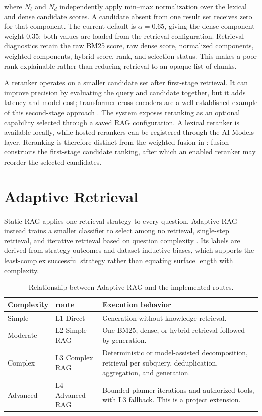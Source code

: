 \noindent where $N_{\ell}$ and $N_d$ independently apply min--max
normalization over the lexical and dense candidate scores. A candidate absent
from one result set receives zero for that component. The current default is
$\alpha=0.65$, giving the dense component weight $0.35$; both values are loaded
from the retrieval configuration. Retrieval diagnostics retain the raw BM25
score, raw dense score, normalized components, weighted components, hybrid
score, rank, and selection status. This makes a poor rank explainable rather
than reducing retrieval to an opaque list of chunks.

A reranker operates on a smaller candidate set after first-stage retrieval. It
can improve precision by evaluating the query and candidate together, but it
adds latency and model cost; transformer cross-encoders are a well-established
example of this second-stage approach \cite{nogueira2019passage}. The system
exposes reranking as an optional capability selected through a saved RAG
configuration. A lexical reranker is available locally, while hosted rerankers
can be registered through the AI Models layer. Reranking is therefore distinct
from the weighted fusion in : fusion constructs the
first-stage candidate ranking, after which an enabled reranker may reorder the
selected candidates.

\section{Adaptive Retrieval}

Static RAG applies one retrieval strategy to every question. Adaptive-RAG
instead trains a smaller classifier to select among no retrieval, single-step
retrieval, and iterative retrieval based on question complexity
\cite{jeong2024adaptiverag}. Its labels are derived from strategy outcomes and
dataset inductive biases, which supports the least-complex successful strategy
rather than equating surface length with complexity.

\begin{table}[H]
  \centering
  \caption{Relationship between Adaptive-RAG and the implemented routes.}
  \label{tab:related-route-comparison}
  \begin{tabularx}{\textwidth}{p{}p{}X}
    \toprule
    Complexity & \SystemName{} route & Execution behavior\\
    \midrule
    Simple & L1 Direct & Generation without knowledge retrieval.\\
    Moderate & L2 Simple RAG & One BM25, dense, or hybrid retrieval followed by generation.\\
    Complex & L3 Complex RAG & Deterministic or model-assisted decomposition, retrieval per subquery, deduplication, aggregation, and generation.\\
    Advanced & L4 Advanced RAG & Bounded planner iterations and authorized tools, with L3 fallback. This is a project extension.\\
    \bottomrule
  \end{tabularx}
\end{table}

